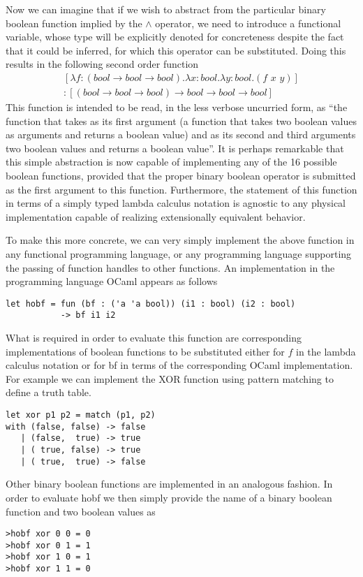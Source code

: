Now we can imagine that if we wish to abstract from the particular
binary boolean function implied by the
$\wedge$ operator, we need to introduce a
functional variable, whose type will be explicitly denoted for
concreteness despite the fact that it could be inferred, for which this
operator can be substituted. Doing this results in the following second
order function
\begin{multline}\label{eq:lamhobf}
[\lambda f:(bool \rightarrow bool \rightarrow bool).
\lambda x:bool. \lambda y:bool.(f\,\,x\,\,y)]
\\
:[(bool \rightarrow bool \rightarrow bool)
\rightarrow bool \rightarrow bool \rightarrow bool]
\end{multline}
This function is intended to be read, in the less verbose uncurried
form, as ``the function that takes as its first argument (a function
that takes two boolean values as arguments and returns a boolean value)
and as its second and third arguments two boolean values and returns a
boolean value''. It is perhaps remarkable that this simple abstraction
is now capable of implementing any of the 16 possible boolean functions,
provided that the proper binary boolean operator is submitted as the
first argument to this function. Furthermore, the statement of this
function in terms of a simply typed lambda calculus notation is agnostic
to any physical implementation capable of realizing extensionally
equivalent behavior.

To make this more concrete, we can very simply implement the above
function in any functional programming language, or any programming
language supporting the passing of function handles to other functions.
An implementation in the programming language OCaml appears as follows
\begin{lstlisting}[caption={a higher order boolean function},label=camlhobf]
let hobf = fun (bf : ('a 'a bool)) (i1 : bool) (i2 : bool)
	       -> bf i1 i2
\end{lstlisting}
What is required in order to evaluate this function are corresponding
implementations of boolean functions to be substituted either for
$f$ in the lambda calculus notation or
for bf in terms of the corresponding OCaml implementation. For example
we can implement the XOR function using pattern matching to define a
truth table.
\begin{lstlisting}[caption={implementation of an XOR boolean operator},label=camlXOR]
let xor p1 p2 = match (p1, p2)
with (false, false) -> false
   | (false,  true) -> true
   | ( true, false) -> true
   | ( true,  true) -> false
\end{lstlisting}
Other binary boolean functions are implemented in an analogous fashion.
In order to evaluate hobf we then simply provide the name of a binary
boolean function and two boolean values as
\begin{lstlisting}[caption={Example output of hobf},label=output]
>hobf xor 0 0 = 0
>hobf xor 0 1 = 1
>hobf xor 1 0 = 1
>hobf xor 1 1 = 0
\end{lstlisting}


